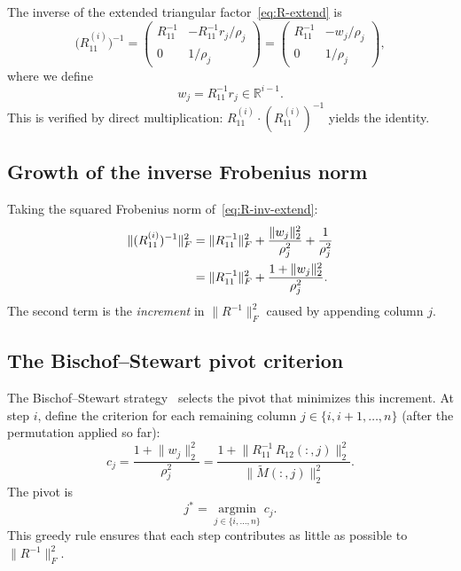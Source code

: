 \documentclass[11pt]{article}
\theoremstyle{definition}
\theoremstyle{remark}
\newcommand{\R}{\mathbb{R}}
\newcommand{\fnorm}[1]{\lVert #1 \rVert_F}
\newcommand{\tnorm}[1]{\lVert #1 \rVert_2}
\begin{document}
The inverse of the extended triangular factor~\eqref{eq:R-extend} is
\begin{equation}\label{eq:R-inv-extend}
  \bigl(R_{11}^{(i)}\bigr)^{-1}
  = \begin{pmatrix} R_{11}^{-1} & -R_{11}^{-1} r_j / \rho_j \\[2pt]
                     0 & 1/\rho_j \end{pmatrix}
  = \begin{pmatrix} R_{11}^{-1} & -w_j / \rho_j \\[2pt]
                     0 & 1/\rho_j \end{pmatrix},
\end{equation}
where we define
\begin{equation}\label{eq:w-def}
  w_j = R_{11}^{-1} r_j \in \R^{i-1}.
\end{equation}
This is verified by direct multiplication:
$R_{11}^{(i)} \cdot (R_{11}^{(i)})^{-1}$ yields the identity.

\subsection{Growth of the inverse Frobenius norm}

Taking the squared Frobenius norm of~\eqref{eq:R-inv-extend}:
\begin{align}
  \fnorm{(R_{11}^{(i)})^{-1}}^2
  &= \fnorm{R_{11}^{-1}}^2
     + \frac{\tnorm{w_j}^2}{\rho_j^2}
     + \frac{1}{\rho_j^2} \notag \\
  &= \fnorm{R_{11}^{-1}}^2
     + \frac{1 + \tnorm{w_j}^2}{\rho_j^2}.
     \label{eq:frob-growth}
\end{align}
The second term is the \emph{increment} in $\fnorm{R^{-1}}^2$ caused
by appending column $j$.

\subsection{The Bischof--Stewart pivot criterion}

The Bischof--Stewart strategy~\cite{bischof1990incremental,
stewart1998incremental} selects the pivot that minimizes this
increment.  At step $i$, define the criterion for each remaining
column $j \in \{i, i+1, \ldots, n\}$ (after the permutation applied
so far):
\begin{equation}\label{eq:criterion}
  c_j
  = \frac{1 + \tnorm{w_j}^2}{\rho_j^2}
  = \frac{1 + \tnorm{R_{11}^{-1}\, R_{12}(:,j)}^2}
         {\tnorm{\widetilde{M}(:,j)}^2}.
\end{equation}
The pivot is
\begin{equation}\label{eq:pivot-rule}
  j^* = \operatorname*{argmin}_{j \in \{i,\ldots,n\}} c_j.
\end{equation}
This greedy rule ensures that each step contributes as little as
possible to $\fnorm{R^{-1}}^2$.
\end{document}
